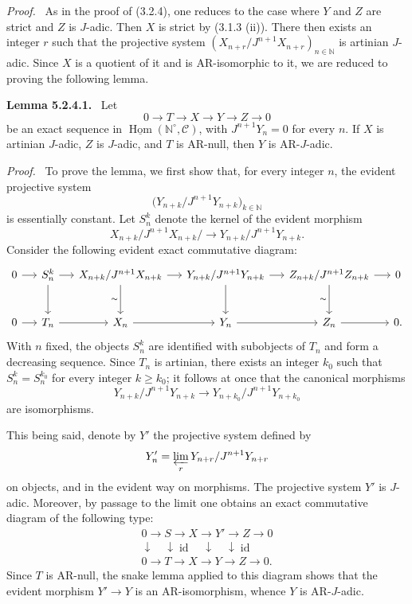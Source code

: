 \documentclass[11pt]{article}
\providecommand{\uHom}{\underline{\Hom}}
\newenvironment{statement}[1]{\par\medskip\noindent\textbf{#1.}\ }{\par\medskip}
\newenvironment{prooftext}[1][Proof]{\par\noindent\emph{#1.}\ }{\par\medskip}
\DeclareMathOperator{\Hom}{Hom}
\providecommand{\id}{\operatorname{id}}
\providecommand{\Hom}{\operatorname{Hom}}
\providecommand{\id}{\operatorname{id}}
\providecommand{\id}{\operatorname{id}}
\providecommand{\id}{\operatorname{id}}
\providecommand{\id}{\operatorname{id}}
\providecommand{\Hom}{\operatorname{Hom}}
\providecommand{\id}{\operatorname{id}}
\begin{document}
\begin{prooftext}
As in the proof of (3.2.4), one reduces to the case where \(Y\) and \(Z\) are strict and \(Z\) is \(J\)-adic. Then \(X\) is strict by (3.1.3 (ii)). There then exists an integer \(r\) such that the projective system \((X_{n+r}/J^{n+1}X_{n+r})_{n\in\mathbb N}\) is artinian \(J\)-adic. Since \(X\) is a quotient of it and is AR-isomorphic to it, we are reduced to proving the following lemma.
\end{prooftext}

\begin{statement}{Lemma 5.2.4.1}
Let
\[
0\longrightarrow T\longrightarrow X\longrightarrow Y\longrightarrow Z\longrightarrow0
\]
be an exact sequence in \(\uHom(\mathbb N^\circ,\mathcal C)\), with \(J^{n+1}Y_n=0\) for every \(n\). If \(X\) is artinian \(J\)-adic, \(Z\) is \(J\)-adic, and \(T\) is AR-null, then \(Y\) is AR-\(J\)-adic.
\end{statement}

\begin{prooftext}
To prove the lemma, we first show that, for every integer \(n\), the evident projective system
\[
\bigl(Y_{n+k}/J^{n+1}Y_{n+k}\bigr)_{k\in\mathbb N}
\]
is essentially constant. Let \(S_n^k\) denote the kernel of the evident morphism
\[
X_{n+k}/J^{n+1}X_{n+k}/\longrightarrow
Y_{n+k}/J^{n+1}Y_{n+k}.
\]
Consider the following evident exact commutative diagram:
\[
\begin{tikzcd}[column sep=1.35em,row sep=large]
0 \arrow[r] & S_n^k \arrow[r] \arrow[d] & X_{n+k}/J^{n+1}X_{n+k} \arrow[r] \arrow[d,"\sim"'] & Y_{n+k}/J^{n+1}Y_{n+k} \arrow[r] \arrow[d] & Z_{n+k}/J^{n+1}Z_{n+k} \arrow[r] \arrow[d,"\sim"'] & 0\\
0 \arrow[r] & T_n \arrow[r] & X_n \arrow[r] & Y_n \arrow[r] & Z_n \arrow[r] & 0 .
\end{tikzcd}
\]
With \(n\) fixed, the objects \(S_n^k\) are identified with subobjects of \(T_n\) and form a decreasing sequence. Since \(T_n\) is artinian, there exists an integer \(k_0\) such that \(S_n^k=S_n^{k_0}\) for every integer \(k\ge k_0\); it follows at once that the canonical morphisms
\[
Y_{n+k}/J^{n+1}Y_{n+k}
\longrightarrow
Y_{n+k_0}/J^{n+1}Y_{n+k_0}
\]
are isomorphisms.

This being said, denote by \(Y'\) the projective system defined by
\[
Y'_n=\varprojlim_r Y_{n+r}/J^{n+1}Y_{n+r}
\]
on objects, and in the evident way on morphisms. The projective system \(Y'\) is \(J\)-adic. Moreover, by passage to the limit one obtains an exact commutative diagram of the following type:
\[
\begin{array}{ccccc}
0\to S\to X\to Y'\to Z\to0\\
\downarrow\quad\downarrow\id\quad\downarrow\quad\downarrow\id\\
0\to T\to X\to Y\to Z\to0 .
\end{array}
\]
Since \(T\) is AR-null, the snake lemma applied to this diagram shows that the evident morphism \(Y'\to Y\) is an AR-isomorphism, whence \(Y\) is AR-\(J\)-adic.
\end{prooftext}
\end{document}
